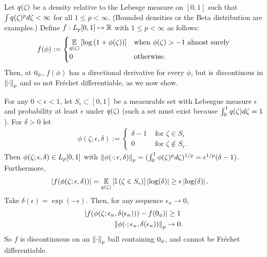 \begin{ex}
%
Let $q(\zeta)$ be a density relative to the Lebesge measure on $[0,1]$ such
that $\int q(\zeta)^p d\zeta < \infty$ for all $1 \le p < \infty$. (Bounded
densities or the Beta distribution are examples.) Define $f: {L_{p}[0,1]} \mapsto
\mathbb{R}$ with $1 \le p < \infty$ as follows:
%
\begin{align*}
%
f(\phi) :=
\begin{cases}
    \expect{\q(\zeta)}{\log \left(1 + \phi(\zeta)\right)} &
    \textrm{when }\phi(\zeta) > -1\textrm{ almost surely} \\
    0 & \textrm{otherwise}.
%
\end{cases}
%
\end{align*}
%
Then, at $0_\phi$,  $f(\phi)$ has a directional derivative for every $\phi$, but
is discontinous in $\left\Vert\cdot\right\Vert_p$ and so not Fr{\'e}chet differentiable, as
we now show.

For any $0 < \epsilon < 1$, let $S_\epsilon \subset [0, 1]$ be a measurable set
with Lebesgue measure $\epsilon$ and probability at least $\epsilon$ under
$q(\zeta)$ (such a set must exist because $\int_0^1 q(\zeta) d\zeta = 1$). For
$\delta > 0$ let
%
\begin{align*}
%
\phi(\zeta; \epsilon, \delta) :=
\begin{cases}
    \delta - 1      & \textrm{ for }\zeta\in S_\epsilon \\
    0      & \textrm{ for }\zeta\notin S_\epsilon.
\end{cases}
%
\end{align*}
%
Then $\phi(\zeta; \epsilon, \delta) \in {L_{p}[0,1]}$ with $\left\Vert\phi(\cdot;
\epsilon, \delta)\right\Vert_p = (\int_0^1 \phi(\zeta)^p d\zeta)^{1/p} =\epsilon^{1/p}
(\delta - 1)$.  Furthermore,
%
\begin{align*}
%
\abs{f(\phi(\zeta; \epsilon, \delta))} ={}&
    \expect{\q(\zeta)}{\ind{\zeta \in S_\epsilon}} \abs{\log(\delta)} \ge
    \epsilon \abs{\log(\delta)}.
%
\end{align*}
Take $\delta(\epsilon) = \exp(-\epsilon)$.  Then, for any sequence $\epsilon_n
\rightarrow 0$,
%
\begin{align*}
%
\abs{f(\phi(\zeta; \epsilon_n, \delta(\epsilon_n))) - f(\phiz)} \ge{}& 1\\
\norm{\phi(\cdot; \epsilon_n, \delta(\epsilon_n))}_p \rightarrow{}& 0.
%
\end{align*}
%
So $f$ is discontinuous on an $\left\Vert\cdot\right\Vert_p$ ball containing $0_\phi$, and
cannot be Fr{\'e}chet differentiable.


\end{ex}
